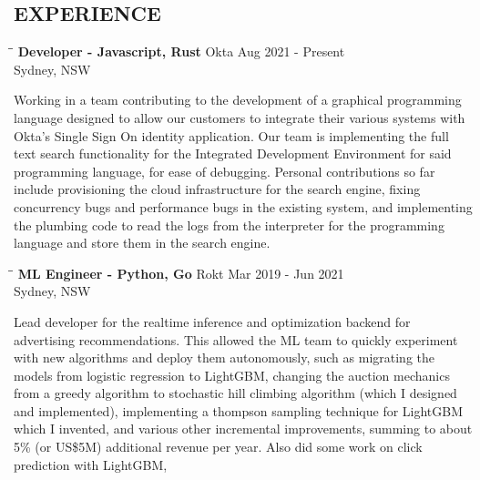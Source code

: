 \documentclass{res}
\begin{document}
\begin{resume}
\section{EXPERIENCE}
   \vspace{-0.1in}	
   \begin{tabbing}
   \hspace{2.3in}\= \hspace{2.6in}\= \kill %
    {\bf Developer - Javascript, Rust} \>Okta \>Aug 2021 - Present\\
                                       \>Sydney, NSW
   \end{tabbing}\vspace{-20pt}      %
    Working in a team contributing to the development of a graphical programming language
    designed to allow our customers to integrate their various systems with Okta's Single
    Sign On identity application. Our team is implementing the full text search functionality
    for the Integrated Development Environment for said programming language, for ease of
    debugging. Personal contributions so far include provisioning the cloud infrastructure
    for the search engine, fixing concurrency bugs and performance bugs in the existing
    system, and implementing the plumbing code to read the logs from the interpreter for the
    programming language and store them in the search engine.
   \begin{tabbing}
   \hspace{2.3in}\= \hspace{2.6in}\= \kill %
    {\bf ML Engineer - Python, Go} \>Rokt \>Mar 2019 - Jun 2021\\
                                   \>Sydney, NSW
   \end{tabbing}\vspace{-20pt}      %
    Lead developer for the realtime inference and optimization backend for advertising
    recommendations. This allowed the ML team to quickly experiment with new algorithms and
    deploy them autonomously, such as migrating the models from logistic regression to LightGBM,
    changing the auction mechanics from a greedy algorithm to stochastic hill climbing algorithm
    (which I designed and implemented), implementing a thompson sampling technique for LightGBM
    which I invented, and various other incremental improvements, summing to about 5\% (or
    US\$5M) additional revenue per year. Also did some work on click prediction with LightGBM,

\end{resume}
\end{document}
